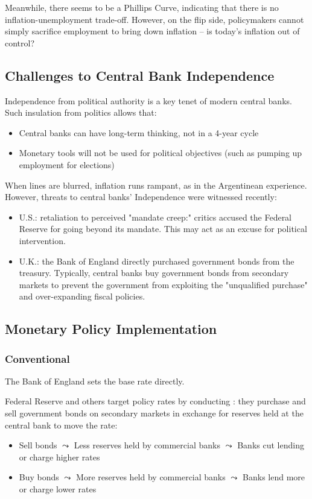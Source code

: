            Meanwhile, there seems to be a  Phillips Curve, indicating that there is no inflation-unemployment trade-off. However, on the flip side, policymakers cannot simply sacrifice employment to bring down inflation -- is today's inflation out of control?

    \subsection{Challenges to Central Bank Independence}

        Independence from political authority is a key tenet of modern central banks. Such insulation from politics allows that:
        \begin{itemize}
            \item Central banks can have long-term thinking, not in a 4-year cycle
            \item Monetary tools will not be used for political objectives (such as pumping up employment for elections)
        \end{itemize}

        When lines are blurred, inflation runs rampant, as in the Argentinean experience. However, threats to central banks' Independence were witnessed recently:
        \begin{itemize}
            \item U.S.: retaliation to perceived "mandate creep:" critics accused the Federal Reserve for going beyond its mandate. This may act as an excuse for political intervention.
            \item U.K.: the Bank of England directly purchased government bonds from the treasury. Typically, central banks buy government bonds from secondary markets to prevent the government from exploiting the "unqualified purchase" and over-expanding fiscal policies.
        \end{itemize}
        
    \subsection{Monetary Policy Implementation}

        \subsubsection{Conventional}
            The Bank of England sets the base rate directly.

            Federal Reserve and others target policy rates by conducting : they purchase and sell government bonds on secondary markets in exchange for reserves held at the central bank to move the rate:
            \begin{itemize}
                \item Sell bonds $\leadsto$ Less reserves held by commercial banks $\leadsto$ Banks cut lending or charge higher rates
                \item Buy bonds $\leadsto$ More reserves held by commercial banks $\leadsto$ Banks lend more or charge lower rates
            \end{itemize}
            
